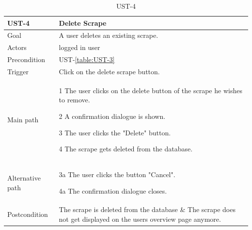 \documentclass[titlepage, 12pt]{article}
\newenvironment{packed_itemize}{
  \vspace{-\topsep}
  \begin{itemize}
    \setlength{\itemsep}{1pt}
    \setlength{\parskip}{0pt}
    \setlength{\parsep}{0pt}
  }{\end{itemize}}
\begin{document}
\begin{table}[H]
  \begin{center}

    \begin{tabular}{p{4cm}|p{10cm}}
      \textbf{UST-4}   & \textbf{Delete Scrape}                                                                                           \\
      \hline
      Goal             & A user deletes an existing scrape.                                                                               \\
      \hline
      Actors           & logged in user                                                                                                   \\
      \hline
      Precondition     & UST-\ref{table:UST-3}                                                                                            \\
      \hline
      Trigger          & Click on the delete scrape button.                                                                               \\
      \hline
      Main path        &

      \begin{packed_itemize}
        \item [1] The user clicks on the delete button of the scrape he wishes to remove.
        \item [2] A confirmation dialogue is shown.
        \item [3] The user clicks the "Delete" button.
        \item [4] The scrape gets deleted from the database.
      \end{packed_itemize}                                                                                                          \\
      \hline
      Alternative path &
      \begin{packed_itemize}
        \item [3a] The user clicks the button "Cancel".
        \item [4a] The confirmation dialogue closes.
      \end{packed_itemize}                                                                                                          \\
      \hline
      Postcondition    & The scrape is deleted from the database \& The scrape does not get displayed on the users overview page anymore. \\
    \end{tabular}
    \vspace{-2mm}
    \caption{UST-4}
    \label{table:UST-4}

  \end{center}
\end{table}
\end{document}
